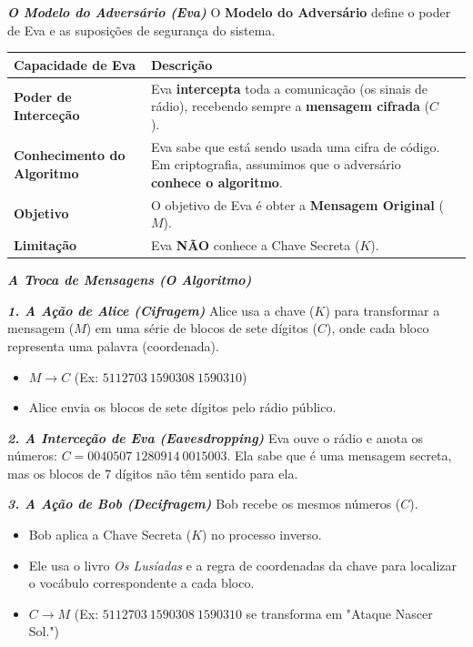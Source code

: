 \documentclass{article}
\theoremstyle{definicao_estilo}
\begin{document}
\par\vspace{0.5em}

\textbf{\textit{O Modelo do Adversário (Eva)}}
O \textbf{Modelo do Adversário} define o poder de Eva e as suposições de segurança do sistema.
\begin{center}
\begin{tabular}{|>{\bfseries}l|p{4.5cm}|p{4.5cm}|}
\hline
\textbf{Capacidade de Eva} & \textbf{Descrição} \\
\hline
\textbf{Poder de Interceção} & Eva \textbf{intercepta} toda a comunicação (os sinais de rádio), recebendo sempre a \textbf{mensagem cifrada} ($C$). \\
\hline
\textbf{Conhecimento do Algoritmo} & Eva sabe que está sendo usada uma cifra de código. Em criptografia, assumimos que o adversário \textbf{conhece o algoritmo}. \\
\hline
\textbf{Objetivo} & O objetivo de Eva é obter a \textbf{Mensagem Original} ($M$). \\
\hline
\textbf{Limitação} & Eva \textbf{NÃO} conhece a Chave Secreta ($K$). \\
\hline
\end{tabular}
\end{center}

\par\vspace{0.5em}

\textbf{\textit{A Troca de Mensagens (O Algoritmo)}}

\par\vspace{0.2em}
\textbf{\textit{1. A Ação de Alice (Cifragem)}}
Alice usa a chave ($K$) para transformar a mensagem ($M$) em uma série de blocos de sete dígitos ($C$), onde cada bloco representa uma palavra (coordenada).
\begin{itemize}
\item $M \to C$ (Ex: $5112703 \ 1590308 \ 1590310$)
\item Alice envia os blocos de sete dígitos pelo rádio público.
\end{itemize}

\par\vspace{0.2em}
\textbf{\textit{2. A Interceção de Eva (Eavesdropping)}}
Eva ouve o rádio e anota os números: $C = 0040507 \ 1280914 \ 0015003$. Ela sabe que é uma mensagem secreta, mas os blocos de 7 dígitos não têm sentido para ela.

\par\vspace{0.2em}
\textbf{\textit{3. A Ação de Bob (Decifragem)}}
Bob recebe os mesmos números ($C$).
\begin{itemize}
\item Bob aplica a Chave Secreta ($K$) no processo inverso.
\item Ele usa o livro \textit{Os Lusíadas} e a regra de coordenadas da chave para localizar o vocábulo correspondente a cada bloco.
\item $C \to M$ (Ex: $5112703 \ 1590308 \ 1590310$ se transforma em "Ataque Nascer Sol.")
\end{itemize}
\end{document}
